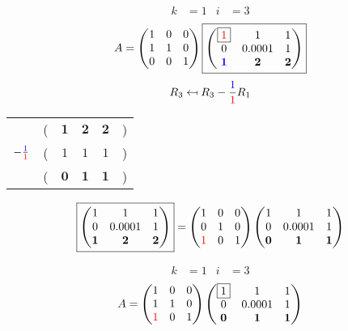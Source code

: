 \documentclass[pdf]{beamer}
\begin{document}
\begin{frame}{}\begin{align*} k &= 1 & i &= 3 \end{align*} $$A=\begin{pmatrix}1&0&0\\1&1&0\\0&0&1\end{pmatrix} \boxed{\begin{pmatrix}\boxed{{\color{red}1}}&1&1\\0&0.0001&1\\\mathbf{{\color{blue}1}}&\mathbf{2}&\mathbf{2}\end{pmatrix}} $$ $$R_3 \mapsfrom R_3 - \frac{{\color{blue}1}}{{\color{red}1}} R_1$$ \begin{center}\begin{tabular}{cccccc}  &(& $ \mathbf{1} $ & $ \mathbf{2} $ & $ \mathbf{2} $ &)\\$ -\frac{{\color{blue}1}}{{\color{red}1}} $&(& $ 1 $ & $ 1 $ & $ 1 $ &)\\\hline  &(& $ \mathbf{0} $ & $ \mathbf{1} $ & $ \mathbf{1} $ &) \end{tabular}\end{center} $$ \boxed{\begin{pmatrix}1&1&1\\0&0.0001&1\\\mathbf{1}&\mathbf{2}&\mathbf{2}\end{pmatrix}} = \begin{pmatrix}1&0&0\\0&1&0\\{\color{red}1}&0&1\end{pmatrix} \begin{pmatrix}1&1&1\\0&0.0001&1\\\mathbf{0}&\mathbf{1}&\mathbf{1}\end{pmatrix} $$\end{frame}
\begin{frame}{}\begin{align*} k &= 1 & i &= 3 \end{align*}$$A=\begin{pmatrix}1&0&0\\1&1&0\\{\color{red}1}&0&1\end{pmatrix} \begin{pmatrix}\boxed{1}&1&1\\0&0.0001&1\\\mathbf{0}&\mathbf{1}&\mathbf{1}\end{pmatrix} $$\end{frame}
\end{document}
